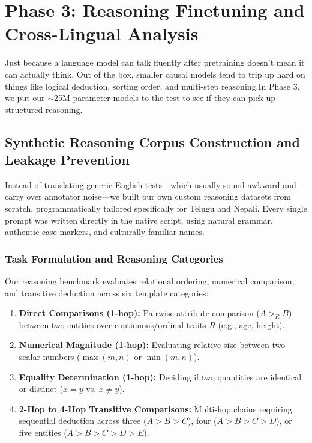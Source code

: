 \documentclass[8pt]{article}
\begin{document}
\section{Phase 3: Reasoning Finetuning and Cross-Lingual Analysis}
\label{sec:phase3}

Just because a language model can talk fluently after pretraining doesn't mean it can actually think. Out of the box, smaller causal models tend to trip up hard on things like logical deduction, sorting order, and multi-step reasoning.In Phase 3, we put our $\sim$25M parameter models to the test to see if they can pick up structured reasoning. 
\subsection{Synthetic Reasoning Corpus Construction and Leakage Prevention}
\label{subsec:reasoning_dataset}

Instead of translating generic English tests—which usually sound awkward and carry over annotator noise—we built our own custom reasoning datasets from scratch, programmatically tailored specifically for Telugu and Nepali. Every single prompt was written directly in the native script, using natural grammar, authentic case markers, and culturally familiar names.
\subsubsection{Task Formulation and Reasoning Categories}
Our reasoning benchmark evaluates relational ordering, numerical comparison, and transitive deduction across six template categories:
\begin{enumerate}
    \item \textbf{Direct Comparisons (1-hop):} Pairwise attribute comparison ($A >_R B$) between two entities over continuous/ordinal traits $R$ (e.g., age, height).
    \item \textbf{Numerical Magnitude (1-hop):} Evaluating relative size between two scalar numbers ($\max(m, n)$ or $\min(m, n)$).
    \item \textbf{Equality Determination (1-hop):} Deciding if two quantities are identical or distinct ($x = y$ vs. $x \neq y$).
    \item \textbf{2-Hop to 4-Hop Transitive Comparisons:} Multi-hop chains requiring sequential deduction across three ($A > B > C$), four ($A > B > C > D$), or five entities ($A > B > C > D > E$).
\end{enumerate}
\end{document}
